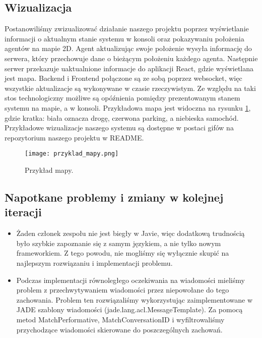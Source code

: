 \newpage
\subsection{Wizualizacja}

Postanowiliśmy zwizualizować działanie naszego projektu poprzez wyświetlanie informacji o aktualnym stanie systemu w konsoli oraz pokazywaniu położenia agentów na mapie 2D. Agent aktualizując swoje położenie wysyła informację do serwera, który przechowuje dane o bieżącym położeniu każdego agenta. Następnie serwer przekazuje uaktualnione informacje do aplikacji React, gdzie wyświetlana jest mapa. Backend i Frontend połączone są ze sobą poprzez websocket, więc wszystkie aktualizacje są wykonywane w czasie rzeczywistym. Ze względu na taki stos technologiczny możliwe są opóźnienia pomiędzy prezentowanym stanem systemu na mapie, a w konsoli. Przykładowa mapa jest widoczna na rysunku \ref{fig:przyklad_mapy}, gdzie kratka: biała oznacza drogę, czerwona parking, a niebieska samochód. Przykładowe wizualizacje naszego systemu są dostępne w postaci gifów na repozytorium naszego projektu w README.

\begin{figure}[H]
    \centering \texttt{[image: przyklad\_mapy.png]}
    \caption{Przykład mapy.}
    \label{fig:przyklad_mapy}
\end{figure}

\newpage
\subsection{Napotkane problemy i zmiany w kolejnej iteracji}
\begin{itemize}
\item Żaden członek zespołu nie jest biegły w Javie, więc dodatkową trudnością  było szybkie zapoznanie się z samym językiem, a nie tylko nowym frameworkiem. Z tego powodu, nie mogliśmy się wyłącznie skupić na najlepszym rozwiązaniu i implementacji problemu.

\item Podczas implementacji równoległego oczekiwania na wiadomości mieliśmy problem z przechwytywaniem wiadomości przez niepowołane do tego zachowania. Problem ten rozwiązaliśmy wykorzystując zaimplementowane w JADE szablony wiadomości (jade.lang.acl.MessageTemplate). Za pomocą metod MatchPerformative, MatchConversationID i wyfiltrowaliśmy przychodzące wiadomości skierowane do poszczególnych zachowań.
\end{itemize}